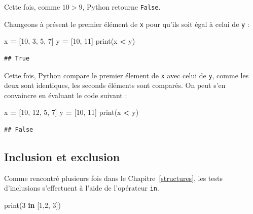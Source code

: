 \documentclass[12pt,]{book}
\newenvironment{Shaded}{\begin{snugshade}}{\end{snugshade}}
\newcommand{\KeywordTok}[1]{\textcolor[rgb]{0.13,0.29,0.53}{\textbf{#1}}}
\newcommand{\DecValTok}[1]{\textcolor[rgb]{0.00,0.00,0.81}{#1}}
\newcommand{\OperatorTok}[1]{\textcolor[rgb]{0.81,0.36,0.00}{\textbf{#1}}}
\newcommand{\BuiltInTok}[1]{#1}
\newcommand{\NormalTok}[1]{#1}
\numberwithin{equation}{section}
\numberwithin{countremarque}{section}
\begin{document}
Cette fois, comme \(10>9\), Python retourne \texttt{False}.

Changeons à présent le premier élément de \texttt{x} pour qu'ils soit
égal à celui de \texttt{y} :

\begin{Shaded}
\begin{Highlighting}[]
\NormalTok{x }\OperatorTok{=}\NormalTok{ [}\DecValTok{10}\NormalTok{, }\DecValTok{3}\NormalTok{, }\DecValTok{5}\NormalTok{, }\DecValTok{7}\NormalTok{]}
\NormalTok{y }\OperatorTok{=}\NormalTok{ [}\DecValTok{10}\NormalTok{, }\DecValTok{11}\NormalTok{]}
\BuiltInTok{print}\NormalTok{(x }\OperatorTok{<}\NormalTok{ y)}
\end{Highlighting}
\end{Shaded}

\begin{lstlisting}
## True
\end{lstlisting}

Cette fois, Python compare le premier élement de \texttt{x} avec celui
de \texttt{y}, comme les deux sont identiques, les seconds éléments sont
comparés. On peut s'en convaincre en évaluant le code suivant :

\begin{Shaded}
\begin{Highlighting}[]
\NormalTok{x }\OperatorTok{=}\NormalTok{ [}\DecValTok{10}\NormalTok{, }\DecValTok{12}\NormalTok{, }\DecValTok{5}\NormalTok{, }\DecValTok{7}\NormalTok{]}
\NormalTok{y }\OperatorTok{=}\NormalTok{ [}\DecValTok{10}\NormalTok{, }\DecValTok{11}\NormalTok{]}
\BuiltInTok{print}\NormalTok{(x }\OperatorTok{<}\NormalTok{ y)}
\end{Highlighting}
\end{Shaded}

\begin{lstlisting}
## False
\end{lstlisting}

\subsection{Inclusion et exclusion}\label{inclusion-et-exclusion}

Comme rencontré plusieurs fois dans le Chapitre~\ref{structures}, les
tests d'inclusions s'effectuent à l'aide de l'opérateur \texttt{in}.

\begin{Shaded}
\begin{Highlighting}[]
\BuiltInTok{print}\NormalTok{(}\DecValTok{3} \KeywordTok{in}\NormalTok{ [}\DecValTok{1}\NormalTok{,}\DecValTok{2}\NormalTok{, }\DecValTok{3}\NormalTok{])}
\end{Highlighting}
\end{Shaded}
\end{document}
